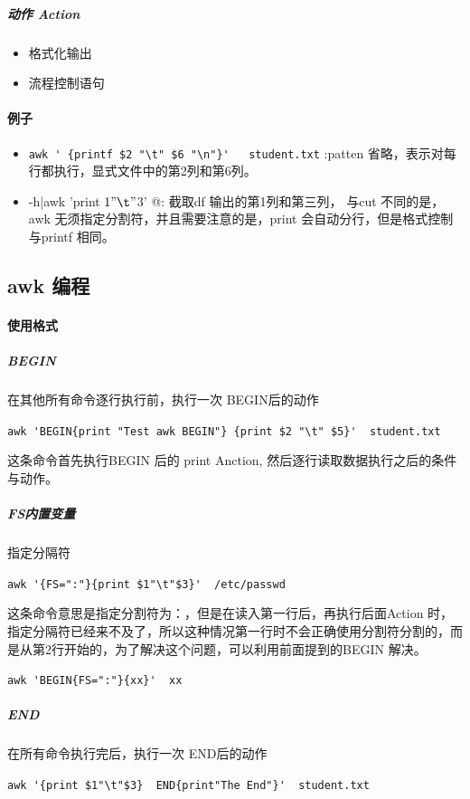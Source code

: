 \documentclass[UTF8,a4paper,12pt]{ctexbook}
\begin{document}
				\subparagraph{动作 Action}
					\begin{itemize}[itemindent = 1em]
						\item 格式化输出
						\item 流程控制语句
					\end{itemize}
			
			\paragraph{例子}
				\begin{itemize}
					\item \verb|awk ' {printf $2 "\t" $6 "\n"}'   student.txt|  :patten 省略，表示对每行都执行，显式文件中的第2列和第6列。
					\item \verb@df -h|awk '{print $1 "\t" $3}' @: 截取df 输出的第1列和第三列， 与cut 不同的是，awk 无须指定分割符，并且需要注意的是，print 会自动分行，但是格式控制与printf 相同。
				\end{itemize}
				
		
		\subsection{awk 编程}
			\paragraph{使用格式}
				
				\subparagraph{BEGIN} 在其他所有命令逐行执行前，执行一次 BEGIN后的动作
				
					\verb|awk 'BEGIN{print "Test awk BEGIN"} {print $2 "\t" $5}'  student.txt|
					
					这条命令首先执行BEGIN 后的 print Anction, 然后逐行读取数据执行之后的条件与动作。
			
				\subparagraph{FS内置变量} 指定分隔符
				
					\verb|awk '{FS=":"}{print $1"\t"$3}'  /etc/passwd|
					
					这条命令意思是指定分割符为：，但是在读入第一行后，再执行后面Action 时，指定分隔符已经来不及了，所以这种情况第一行时不会正确使用分割符分割的，而是从第2行开始的，为了解决这个问题，可以利用前面提到的BEGIN 解决。
					
					\verb|awk 'BEGIN{FS=":"}{xx}'  xx|
				
				\subparagraph{END} 在所有命令执行完后，执行一次 END后的动作
					
					\verb|awk '{print $1"\t"$3}  END{print"The End"}'  student.txt|	
					
\end{document}
